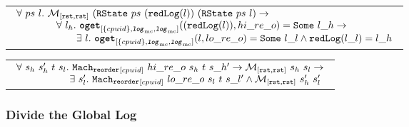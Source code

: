 \begin{hypothesis}
\begin{tabular}{P{0.95\textwidth}}
$
\begin{array}{l}
\forall \ ps \ l.\ \matchrrstaterrstae{(\rstate{ps}{(\mcreducelogfuncnoeq{l})}}{(\rstate{ps}{l})} \rightarrow \\
\ \ \ \ \ \ \ \ \ \ \ \ \forall \ l_h. \ \oget{\set{cpuid}}{\mclog}{\mclog}{(\mcreducelogfuncnoeq{l})}{hi\_re\_o}{l\_h} \rightarrow \\
\ \ \ \ \ \ \ \ \ \ \ \ \ \ \ \ \ \ \exists \ l. \ \oget{\set{cpuid}}{\mclog}{\mclog}{l}{lo\_re\_o}{l\_l} \wedge \mcreducelogfunc{l\_l}{l\_h} \\
\end{array}
$
\end{tabular}
\end{hypothesis}

\begin{lemma}
\begin{tabular}{P{0.95\textwidth}}
$
\begin{array}{l}
\forall \ s_h \ s_h' \ t \ s_l . \ \singlereorderstep{cpuid}{hi\_re\_o}{s_h}{t}{s\_h'} \rightarrow \matchrrstaterrstae{s_h}{s_l} \rightarrow \\
\ \ \ \ \ \ \ \ \ \ \ \ \ \ \ \ \exists\ s_l' . \  \singlereorderstep{cpuid}{lo\_re\_o}{s_l}{t}{s\_l'} \wedge  \matchrrstaterrstae{s_h'}{s_l'}\\
\end{array}
$
\end{tabular}
\end{lemma}


\subsubsection{Divide the Global Log}

